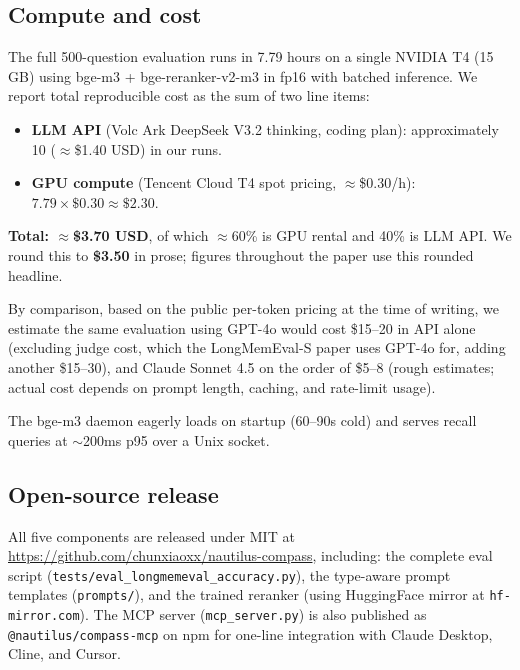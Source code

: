 \subsection{Compute and cost}

The full 500-question evaluation runs in 7.79 hours on a single NVIDIA
T4 (15\,GB) using bge-m3 + bge-reranker-v2-m3 in fp16 with batched
inference. We report total reproducible cost as the sum of two line
items:

\begin{itemize}
\item \textbf{LLM API} (Volc Ark DeepSeek V3.2 thinking, coding plan):
  approximately \cny{}10 ($\approx$\$1.40 USD) in our runs.
\item \textbf{GPU compute} (Tencent Cloud T4 spot pricing,
  $\approx$\$0.30/h): $7.79 \times \$0.30 \approx \$2.30$.
\end{itemize}

\noindent
\textbf{Total: $\approx$\$3.70 USD}, of which $\approx$60\% is GPU
rental and 40\% is LLM API. We round this to \textbf{\$3.50} in
prose; figures throughout the paper use this rounded headline.

By comparison, based on the public per-token pricing at the time of
writing, we estimate the same evaluation using GPT-4o would cost
\$15--20 in API alone (excluding judge cost, which the LongMemEval-S
paper uses GPT-4o for, adding another \$15--30), and Claude Sonnet 4.5
on the order of \$5--8 (rough estimates; actual cost depends on
prompt length, caching, and rate-limit usage).

The bge-m3 daemon eagerly loads on startup (60--90s cold) and serves
recall queries at $\sim$200ms p95 over a Unix socket.

\subsection{Open-source release}

All five components are released under MIT at
\url{https://github.com/chunxiaoxx/nautilus-compass}, including:
the complete eval script (\texttt{tests/eval\_longmemeval\_accuracy.py}), the
type-aware prompt templates (\texttt{prompts/}), and the trained
reranker (using HuggingFace mirror at \texttt{hf-mirror.com}). The MCP
server (\texttt{mcp\_server.py}) is also published as
\texttt{@nautilus/compass-mcp} on npm for one-line integration with
Claude Desktop, Cline, and Cursor.
